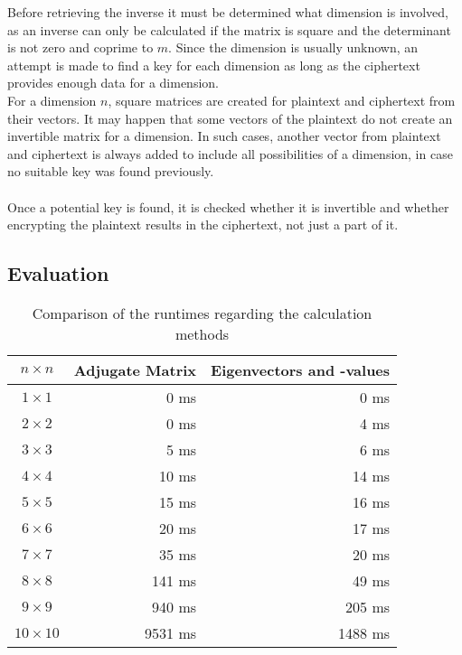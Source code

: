 \documentclass[conference]{IEEEtran}
\begin{document}
Before retrieving the inverse it must be determined what dimension is involved, as an inverse can only be calculated if the matrix is square and the determinant is not zero and coprime to \(m\). Since the dimension is usually unknown, an attempt is made to find a key for each dimension as long as the ciphertext provides enough data for a dimension.
\\
For a dimension \(n\), square matrices are created for plaintext and ciphertext from their vectors. It may happen that some vectors of the plaintext do not create an invertible matrix for a dimension. In such cases, another vector from plaintext and ciphertext is always added to include all possibilities of a dimension, in case no suitable key was found previously.
\\\\
Once a potential key is found, it is checked whether it is invertible and whether encrypting the plaintext results in the ciphertext, not just a part of it.\\



\subsection{Evaluation}

\begin{table}[h!]
\centering
\caption{Comparison of the runtimes regarding the calculation methods}
\label{tab:runtime_table}
\begin{tabular}{|c|r|r|}
\hline
 \textbf{\( n \times n \)}& \textbf{Adjugate Matrix} & \textbf{Eigenvectors and -values} \\
\hline
 \( 1 \times 1 \)& 0 ms & 0 ms\\
\( 2 \times 2 \)& 0 ms & 4 ms\\
\( 3 \times 3 \)& 5 ms & 6 ms\\
\( 4 \times 4 \)& 10 ms & 14 ms\\
\( 5 \times 5 \)& 15 ms & 16 ms\\
\( 6 \times 6 \)& 20 ms & 17 ms\\
\( 7 \times 7 \)& 35 ms & 20 ms\\
\( 8 \times 8 \)& 141 ms & 49 ms\\
\( 9 \times 9\)& 940 ms & 205 ms\\
\( 10 \times 10 \)& 9531 ms & 1488 ms\\
\hline
\end{tabular}
\end{table}
\end{document}
